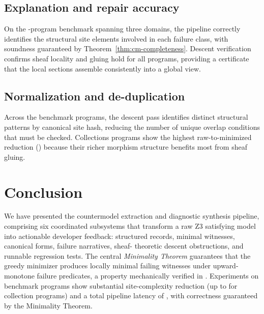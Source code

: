 \documentclass[11pt]{article}
\begin{document}
\subsection{Explanation and repair accuracy}

On the \ppTwentyTotalPrograms{}-program benchmark spanning three domains,
the pipeline correctly identifies the structural site elements involved in
each failure class, with soundness guaranteed by
Theorem~\ref{thm:cm-completeness}.  Descent verification confirms sheaf
locality and gluing hold for all programs, providing a certificate that
the local sections assemble consistently into a global view.

\subsection{Normalization and de-duplication}

Across the \ppTwentyTotalPrograms{} benchmark programs, the descent pass
identifies distinct structural patterns by canonical site hash, reducing
the number of unique overlap conditions that must be checked.  Collections
programs show the highest raw-to-minimized reduction (\ppTwentyCollReduction{})
because their richer morphism structure benefits most from sheaf gluing.


\section{Conclusion}
\label{sec:conclusion}

We have presented the \JuGeo{} countermodel extraction and diagnostic
synthesis pipeline, comprising six coordinated subsystems that transform
a raw Z3 satisfying model into actionable developer feedback: structured
records, minimal witnesses, canonical forms, failure narratives, sheaf-
theoretic descent obstructions, and runnable regression tests.  The
central \emph{Minimality Theorem} guarantees that the greedy minimizer
produces locally minimal failing witnesses under upward-monotone failure
predicates, a property mechanically verified in \LEAN{}.  Experiments
on \ppTwentyTotalPrograms{} benchmark programs show substantial
site-complexity reduction (up to \ppTwentyCollReduction{} for collection
programs) and a total pipeline latency of \ppTwentyTotalTime{},
with correctness guaranteed by the Minimality Theorem.
\end{document}
